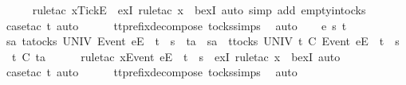 \begin{isabellebody}
\ \ \ \ \isamarkupfalse%
\ {\isacharparenleft}rule{\isacharunderscore}tac\ x{\isacharequal}{\isachardoublequoteopen}{\isacharbrackleft}{\isacharbrackleft}Tick{\isacharbrackright}\isactrlsub E{\isacharbrackright}{\isachardoublequoteclose}\ \ exI{\isacharcomma}\ rule{\isacharunderscore}tac\ x{\isacharequal}{\isachardoublequoteopen}{\isacharbrackleft}{\isacharbrackright}{\isachardoublequoteclose}\ \ bexI{\isacharcomma}\ auto\ simp\ add{\isacharcolon}\ empty{\isacharunderscore}in{\isacharunderscore}tocks{\isacharparenright}\isanewline
\ \ \ \ \isamarkupfalse%
\ {\isacharparenleft}case{\isacharunderscore}tac\ t{\isacharprime}{\isacharcomma}\ auto{\isacharparenright}\isanewline
\ \ \ \ \isamarkupfalse%
\ tt{\isacharunderscore}prefix{\isacharunderscore}decompose\ tocks{\isachardot}simps\ \isamarkupfalse%
\ auto\isanewline
{}\isamarkupfalse%
\isanewline
\ \ \isamarkupfalse%
\ e\ s\ t\isanewline
\ \ \isamarkupfalse%
\ {\isachardoublequoteopen}{\isasymexists}sa{\isachardot}\ {\isasymexists}ta{\isasymin}tocks\ UNIV{\isachardot}\ {\isacharbrackleft}Event\ e{\isacharbrackright}\isactrlsub E\ {\isacharhash}\ t\ {\isacharat}\ s\ {\isacharequal}\ ta\ {\isacharat}\ sa\ {\isasymand}\ {\isacharparenleft}{\isasymforall}t{\isacharprime}{\isasymin}tocks\ UNIV{\isachardot}\ t{\isacharprime}\ {\isasymle}\isactrlsub C\ {\isacharbrackleft}Event\ e{\isacharbrackright}\isactrlsub E\ {\isacharhash}\ t\ {\isacharat}\ s\ {\isasymlongrightarrow}\ t{\isacharprime}\ {\isasymle}\isactrlsub C\ ta{\isacharparenright}{\isachardoublequoteclose}\isanewline
\ \ \ \ \isamarkupfalse%
\ {\isacharparenleft}rule{\isacharunderscore}tac\ x{\isacharequal}{\isachardoublequoteopen}{\isacharbrackleft}Event\ e{\isacharbrackright}\isactrlsub E\ {\isacharhash}\ t\ {\isacharat}\ s{\isachardoublequoteclose}\ \ exI{\isacharcomma}\ rule{\isacharunderscore}tac\ x{\isacharequal}{\isachardoublequoteopen}{\isacharbrackleft}{\isacharbrackright}{\isachardoublequoteclose}\ \ bexI{\isacharcomma}\ auto{\isacharparenright}\isanewline
\ \ \ \ \isamarkupfalse%
\ {\isacharparenleft}case{\isacharunderscore}tac\ t{\isacharprime}{\isacharcomma}\ auto{\isacharparenright}\isanewline
\ \ \ \ \isamarkupfalse%
\ tt{\isacharunderscore}prefix{\isacharunderscore}decompose\ tocks{\isachardot}simps\ \isamarkupfalse%
\ auto\isanewline
{}\isamarkupfalse%
\isanewline
\ \ \isamarkupfalse%

\end{isabellebody}
